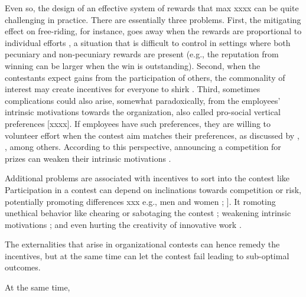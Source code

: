 \documentclass[11pt, titlepage]{article}
\begin{document}
Even so, the design of an effective system of rewards that max xxxx can
be quite challenging in practice. There are essentially three problems.
First, the mitigating effect on free-riding, for instance, goes away
when the rewards are proportional to individual efforts
\citep{morgan2000financing}, a situation that is difficult to control in
settings where both pecuniary and non-pecuniary rewards are present
(e.g., the reputation from winning can be larger when the win is
outstanding). Second, when the contestants expect gains from the
participation of others, the commonality of interest may create
incentives for everyone to shirk \citep{drago1988incentive}. Third,
sometimes complications could also arise, somewhat paradoxically, from
the employees' intrinsic motivations towards the organization, also
called pro-social vertical preferences {[}xxxx{]}. If employees have
such preferences, they are willing to volunteer effort when the contest
aim matches their preferences, as discussed by
\citet{besley2005competition}, \citet{prendergast2007motivation},
\citet{delfgaauw2008incentives} among others. According to this
perspective, announcing a competition for prizes can weaken their
intrinsic motivations \citep{reeve1996elements, frey1997not}.

Additional problems are associated with incentives to sort into the
contest like Participation in a contest can depend on inclinations
towards competition or risk, potentially promoting differences xxx e.g.,
men and women \citet{niederle2007women}; \citet{croson2009gender}{]}. It
romoting unethical behavior like chearing or sabotaging the contest
\citep{lazear1989pay, charness2013dark}; weakening intrinsic motivations
\citep{reeve1996elements, frey1997not}; and even hurting the creativity
of innovative work \citep{erat2015incentives}.

The externalities that arise in organizational contests can hence remedy
the incentives, but at the same time can let the contest fail leading to
sub-optimal outcomes.

At the same time,
\end{document}
